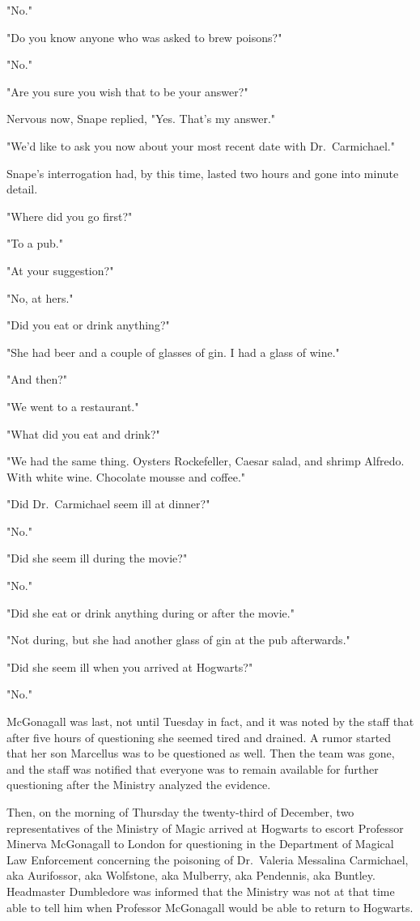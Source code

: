 "No."

"Do you know anyone who was asked to brew poisons?"

"No."

"Are you sure you wish that to be your answer?"

Nervous now, Snape replied, "Yes. That's my answer."

"We'd like to ask you now about your most recent date with Dr.~Carmichael."

Snape's interrogation had, by this time, lasted two hours and gone into minute detail.

"Where did you go first?"

"To a pub."

"At your suggestion?"

"No, at hers."

"Did you eat or drink anything?"

"She had beer and a couple of glasses of gin. I had a glass of wine."

"And then?"

"We went to a restaurant."

"What did you eat and drink?"

"We had the same thing. Oysters Rockefeller, Caesar salad, and shrimp Alfredo. With white wine. Chocolate mousse and coffee."

"Did Dr.~Carmichael seem ill at dinner?"

"No."

"Did she seem ill during the movie?"

"No."

"Did she eat or drink anything during or after the movie."

"Not during, but she had another glass of gin at the pub afterwards."

"Did she seem ill when you arrived at Hogwarts?"

"No."

McGonagall was last, not until Tuesday in fact, and it was noted by the staff that after five hours of questioning she seemed tired and drained. A rumor started that her son Marcellus was to be questioned as well. Then the team was gone, and the staff was notified that everyone was to remain available for further questioning after the Ministry analyzed the evidence.

Then, on the morning of Thursday the twenty-third of December, two representatives of the Ministry of Magic arrived at Hogwarts to escort Professor Minerva McGonagall to London for questioning in the Department of Magical Law Enforcement concerning the poisoning of Dr.~Valeria Messalina Carmichael, aka Aurifossor, aka Wolfstone, aka Mulberry, aka Pendennis, aka Buntley. Headmaster Dumbledore was informed that the Ministry was not at that time able to tell him when Professor McGonagall would be able to return to Hogwarts.

